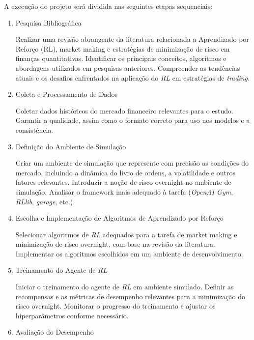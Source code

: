 
A execução do projeto será dividida nas seguintes etapas sequenciais:

\begin{enumerate}

\item Pesquisa Bibliográfica \label{item:bibliography_review}

Realizar uma revisão abrangente da literatura relacionada a Aprendizado por Reforço (RL), market making e estratégias de minimização de risco em finanças quantitativas.
Identificar os principais conceitos, algoritmos e abordagens utilizados em pesquisas anteriores.
Compreender as tendências atuais e os desafios enfrentados na aplicação do \textit{RL} em estratégias de \textit{trading}.

\item Coleta e Processamento de Dados \label{item:data}

Coletar dados históricos do mercado financeiro relevantes para o estudo.
Garantir a qualidade, assim como o formato correto para uso nos modelos e a consistência.

\item Definição do Ambiente de Simulação \label{item:environment}

Criar um ambiente de simulação que represente com precisão as condições do mercado, incluindo a dinâmica do livro de ordens, a volatilidade e outros fatores relevantes. Introduzir a noção de risco overnight no ambiente de simulação. Analisar o framework mais adequado à tarefa (\textit{OpenAI Gym}, \textit{RLlib}, \textit{garage}, etc.).

\item Escolha e Implementação de Algoritmos de Aprendizado por Reforço \label{item:agent}

Selecionar algoritmos de \textit{RL} adequados para a tarefa de market making e minimização de risco overnight, com base na revisão da literatura. Implementar os algoritmos escolhidos em um ambiente de desenvolvimento.

\item Treinamento do Agente de \textit{RL} \label{item:training}

Iniciar o treinamento do agente de \textit{RL} em ambiente simulado. Definir as recompensas e as métricas de desempenho relevantes para a minimização do risco overnight. Monitorar o progresso do treinamento e ajustar os hiperparâmetros conforme necessário.

\item Avaliação do Desempenho \label{item:evaluation}


\end{enumerate}
